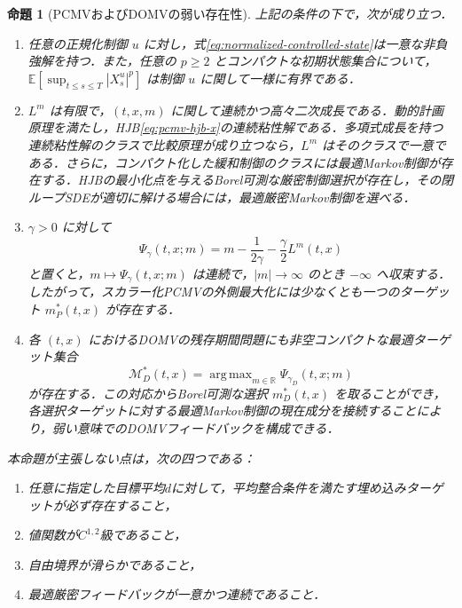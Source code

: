 \documentclass[10pt,a4paper]{article}
\theoremstyle{plain}
\newtheorem{proposition}{命題}
\theoremstyle{definition}
\newcommand{\E}{\mathbb{E}}
\DeclareMathOperator*{\argmax}{arg\,max}
\begin{document}
\begin{proposition}[PCMVおよびDOMVの弱い存在性]
\label{prop:weak-existence-pcmv-domv}
上記の条件の下で，次が成り立つ．
\begin{enumerate}[label=(\roman*),leftmargin=2.2em]
 \item 任意の正規化制御 $u$ に対し，式\eqref{eq:normalized-controlled-state}は一意な非負強解を持つ．また，任意の $p\geq2$ とコンパクトな初期状態集合について，$\E[\sup_{t\leq s\leq T}|X_s^u|^p]$ は制御 $u$ に関して一様に有界である．
 \item $L^m$ は有限で，$(t,x,m)$ に関して連続かつ高々二次成長である．動的計画原理を満たし，HJB\eqref{eq:pcmv-hjb-x}の連続粘性解である．多項式成長を持つ連続粘性解のクラスで比較原理が成り立つなら，$L^m$ はそのクラスで一意である．さらに，コンパクト化した緩和制御のクラスには最適Markov制御が存在する．HJBの最小化点を与えるBorel可測な厳密制御選択が存在し，その閉ループSDEが適切に解ける場合には，最適厳密Markov制御を選べる．
 \item $\gamma>0$ に対して
 \begin{equation}
  \Psi_\gamma(t,x;m)
  =m-\frac{1}{2\gamma}-\frac{\gamma}{2}L^m(t,x)
  \label{eq:app-scalarized-envelope}
 \end{equation}
 と置くと，$m\mapsto\Psi_\gamma(t,x;m)$ は連続で，$|m|\to\infty$ のとき $-\infty$ へ収束する．したがって，スカラー化PCMVの外側最大化には少なくとも一つのターゲット $m_P^*(t,x)$ が存在する．
 \item 各 $(t,x)$ におけるDOMVの残存期間問題にも非空コンパクトな最適ターゲット集合
 \[
   \mathcal M_D^*(t,x)=\argmax_{m\in\mathbb R}\Psi_{\gamma_D}(t,x;m)
 \]
 が存在する．この対応からBorel可測な選択 $m_D^*(t,x)$ を取ることができ，各選択ターゲットに対する最適Markov制御の現在成分を接続することにより，弱い意味でのDOMVフィードバックを構成できる．
\end{enumerate}
本命題が主張しない点は，次の四つである：
\begin{enumerate}[label=(\alph*),leftmargin=2.2em,noitemsep,topsep=2pt]
 \item 任意に指定した目標平均$d$に対して，平均整合条件を満たす埋め込みターゲットが必ず存在すること，
 \item 値関数が$C^{1,2}$級であること，
 \item 自由境界が滑らかであること，
 \item 最適厳密フィードバックが一意かつ連続であること．
\end{enumerate}
\end{proposition}
\end{document}

